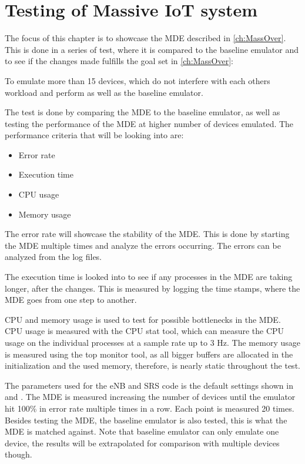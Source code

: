 \chapter{Testing of Massive IoT system} \label{ch:mass_test}
The focus of this chapter is to showcase the \gls{MDE} described in \autoref{ch:MassOver}. This is done in a series of test, where it is compared to the baseline emulator and to see if the changes made fulfills the goal set in \autoref{ch:MassOver}:

To emulate more than 15 devices, which do not interfere with each others workload and perform as well as the baseline emulator.


The test is done by comparing the \gls{MDE} to the baseline emulator, as well as testing the performance of the MDE at higher number of devices emulated.
The performance criteria that will be looking into are:

\begin{itemize}
\item Error rate
\item Execution time
\item CPU usage
\item Memory usage
\end{itemize}

The error rate will showcase the stability of the MDE. This is done by starting the MDE multiple times and analyze the errors occurring. The errors can be analyzed from the log files.

The execution time is looked into to see if any processes in the MDE are taking longer, after the changes. This is measured by logging the time stamps, where the MDE goes from one step to another. 

CPU and memory usage is used to test for possible bottlenecks in the MDE. CPU usage is measured with the CPU stat tool, which can measure the CPU usage on the individual processes at a sample rate up to 3 Hz. The memory usage is measured using the top monitor tool, as all bigger buffers are allocated in the initialization and the used memory, therefore, is nearly static throughout the test. 

The parameters used for the eNB and SRS code is the default settings shown in  and . The MDE is measured increasing the number of devices until the emulator hit 100\% in error rate multiple times in a row. Each point is measured 20 times. Besides testing the MDE, the baseline emulator is also tested, this is what the MDE is matched against. Note that baseline emulator can only emulate one device, the results will be extrapolated for comparison with multiple devices though.


